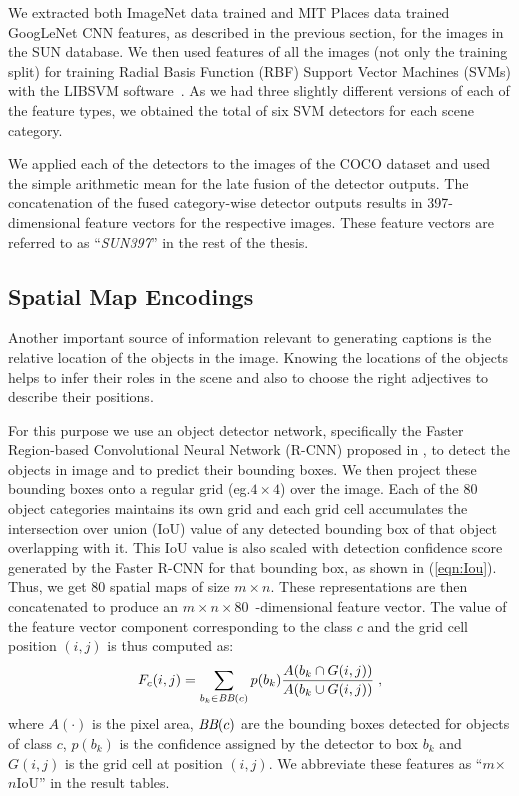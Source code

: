 We extracted both ImageNet data trained and MIT Places data trained GoogLeNet
CNN features, as described in the previous section, for the images in the SUN
database.
We then used features of all the images (not only the training split) for
training Radial Basis Function (RBF) Support Vector Machines (SVMs) with the
LIBSVM software~\cite{LIBSVM}.
As we had three slightly different versions of each of the feature types, we
obtained the total of six SVM detectors for each scene category.

We applied each of the detectors to the images of the COCO dataset and used the
simple arithmetic mean for the late fusion of the detector outputs.
The concatenation of the fused category-wise detector outputs results in
397-dimensional feature vectors for the respective images.
These feature vectors are referred to as ``\emph{SUN397}'' in the rest of the
thesis.

\subsection{Spatial Map Encodings}
\label{sec:frcnnfeat}
Another important source of information relevant to generating captions is the
relative location of the objects in the image. 
Knowing the locations of the objects helps to infer their roles in the scene and
also to choose the right adjectives to describe their positions.

For this purpose we use an object detector network, specifically the Faster
Region-based Convolutional Neural Network (R-CNN) proposed in
\cite{ren15fasterrcnn}, to detect the objects in image and to predict their
bounding boxes.
We then project these bounding boxes onto a regular grid (eg.\@ $4\times4$) over
the image. 
Each of the 80 object categories maintains its own grid and each grid cell
accumulates the intersection over union (IoU) value of any detected bounding box
of that object overlapping with it.
This IoU value is also scaled with detection confidence score generated by the
Faster R-CNN for that bounding box, as shown in (\ref{eqn:Iou}).
Thus, we get 80 spatial maps of size $m\times n$. 
These representations are then concatenated to produce an $m\times
n\times80$~-dimensional feature vector.
The value of the feature vector component corresponding to the class $c$ and the
grid cell position $(i,j)$ is thus computed as:
\begin{equation} \label{eqn:Iou} F_c(i,j) = \sum_{b_k \in \text{\it
BB}(c)}p(b_k)\frac{ A(b_k \cap G(i,j))}{A(b_k \cup G(i,j))} \;, \end{equation}
where $A(\cdot)$ is the pixel area, $\text{\it BB}(c)$ are the bounding boxes
detected for objects of class $c$, $p(b_k)$ is the confidence assigned by the
detector to box $b_k$ and $G(i,j)$ is the grid cell at position $(i,j)$.
We abbreviate these features as ``$m$$\times${}$n$IoU'' in the result tables.

